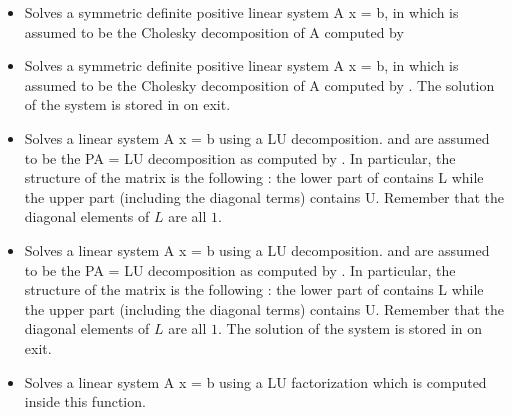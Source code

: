 \begin{itemize}
\item {} 
  \sshortdescribe Solves a symmetric definite positive linear system A x = b, 
  in which  is assumed to be the Cholesky decomposition of A
  computed by 


\item {} 
  \sshortdescribe Solves a symmetric definite positive linear system A x = b, 
  in which  is assumed to be the Cholesky decomposition of A
  computed by . The solution of the system is stored in
   on exit.

\item {} 
  \sshortdescribe Solves a linear system A x = b using a LU decomposition.
   and  are assumed to be the PA = LU decomposition as computed
  by . In particular, the structure of the matrix 
  is the following : the lower part of  contains L while the upper part
  (including the diagonal terms) contains U. Remember that the diagonal
  elements of $L$ are all $1$.

\item {} 
  \sshortdescribe Solves a linear system A x = b using a LU decomposition.
   and  are assumed to be the PA = LU decomposition as computed
  by . In particular, the structure of the matrix 
  is the following : the lower part of  contains L while the upper part
  (including the diagonal terms) contains U. Remember that the diagonal
  elements of $L$ are all $1$. The solution of the system is stored in 
  on exit.
  
\item {} 
  \sshortdescribe Solves a linear system A x = b using a LU factorization
  which is computed inside this function.


\end{itemize}
